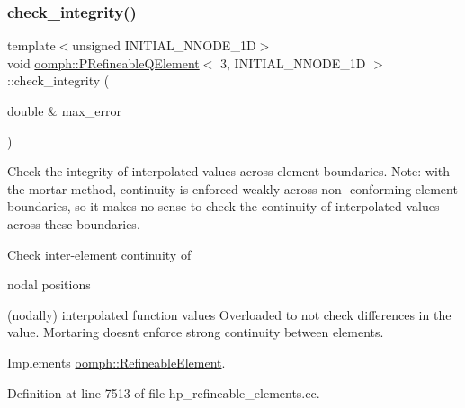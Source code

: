 \subsubsection{\texorpdfstring{check\+\_\+integrity()}{check\_integrity()}}
{\footnotesize\ttfamily template$<$unsigned I\+N\+I\+T\+I\+A\+L\+\_\+\+N\+N\+O\+D\+E\+\_\+1D$>$ \\
void \hyperlink{classoomph_1_1PRefineableQElement}{oomph\+::\+P\+Refineable\+Q\+Element}$<$ 3, I\+N\+I\+T\+I\+A\+L\+\_\+\+N\+N\+O\+D\+E\+\_\+1D $>$\+::check\+\_\+integrity (\begin{DoxyParamCaption}\item[{double \&}]{max\+\_\+error }\end{DoxyParamCaption})\hspace{0.3cm}{\ttfamily [virtual]}}



Check the integrity of interpolated values across element boundaries. Note\+: with the mortar method, continuity is enforced weakly across non-\/ conforming element boundaries, so it makes no sense to check the continuity of interpolated values across these boundaries. 

Check inter-\/element continuity of
\begin{DoxyItemize}
\item nodal positions
\item (nodally) interpolated function values Overloaded to not check differences in the value. Mortaring doesn\textquotesingle{}t enforce strong continuity between elements. 
\end{DoxyItemize}

Implements \hyperlink{classoomph_1_1RefineableElement_ae665f2d2eb0b6410ddcb101caa80922a}{oomph\+::\+Refineable\+Element}.



Definition at line 7513 of file hp\+\_\+refineable\+\_\+elements.\+cc.

\mbox{\label{classoomph_1_1PRefineableQElement_3_013_00_01INITIAL__NNODE__1D_01_4_a72ca434f5b7bba948f3a8f280c53a857}} 
